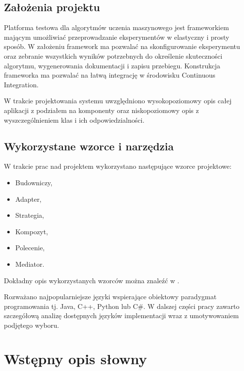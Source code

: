 \documentclass[12pt]{article}
\begin{document}
\subsection{Założenia projektu}

Platforma testowa dla algorytmów uczenia maszynowego jest frameworkiem mającym umożliwiać przeprowadzanie eksperymentów w elastyczny i prosty sposób. W założeniu framework ma pozwalać na skonfigurowanie eksperymentu oraz zebranie wszystkich wyników potrzebnych do określenie skuteczności algorytmu, wygenerowania dokumentacji i zapisu przebiegu. Konstrukcja frameworka ma pozwalać na łatwą integrację w środowisku Continuous Integration.

W trakcie projektowania systemu uwzględniono wysokopoziomowy opis całej aplikacji z podziałem na komponenty oraz niskopoziomowy opis z wyszczególnieniem klas i ich odpowiedzialności.

\subsection{Wykorzystane wzorce i narzędzia}

W trakcie prac nad projektem wykorzystano następujące wzorce projektowe:

\begin{itemize}
	\item Budowniczy,
	\item Adapter,
	\item Strategia,
	\item Kompozyt,
	\item Polecenie,
	\item Mediator.
\end{itemize}

Dokładny opis wykorzystanych wzorców można znaleźć w \cite{gang-of-four}.

Rozważano najpopularniejsze języki wspierające obiektowy paradygmat programowania tj. Java, C++, Python lub C\#. W dalszej części pracy zawarto szczegółową analizę dostępnych języków implementacji wraz z umotywowaniem podjętego wyboru. 


\section{Wstępny opis słowny}
\end{document}
